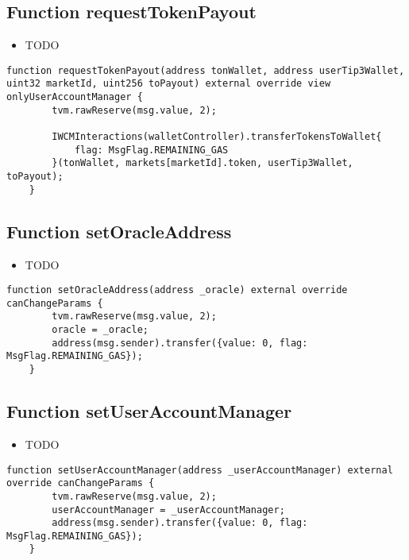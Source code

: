 \subsection{Function requestTokenPayout}

\noindent\begin{itemize}
\item TODO
\end{itemize}

\begin{lstlisting}[firstnumber=413]
    function requestTokenPayout(address tonWallet, address userTip3Wallet, uint32 marketId, uint256 toPayout) external override view onlyUserAccountManager {
        tvm.rawReserve(msg.value, 2);

        IWCMInteractions(walletController).transferTokensToWallet{
            flag: MsgFlag.REMAINING_GAS
        }(tonWallet, markets[marketId].token, userTip3Wallet, toPayout);
    }
\end{lstlisting}

\subsection{Function setOracleAddress}

\noindent\begin{itemize}
\item TODO
\end{itemize}

\begin{lstlisting}[firstnumber=501]
    function setOracleAddress(address _oracle) external override canChangeParams {
        tvm.rawReserve(msg.value, 2);
        oracle = _oracle;
        address(msg.sender).transfer({value: 0, flag: MsgFlag.REMAINING_GAS});
    }
\end{lstlisting}

\subsection{Function setUserAccountManager}

\noindent\begin{itemize}
\item TODO
\end{itemize}

\begin{lstlisting}[firstnumber=483]
    function setUserAccountManager(address _userAccountManager) external override canChangeParams {
        tvm.rawReserve(msg.value, 2);
        userAccountManager = _userAccountManager;
        address(msg.sender).transfer({value: 0, flag: MsgFlag.REMAINING_GAS});
    }
\end{lstlisting}

